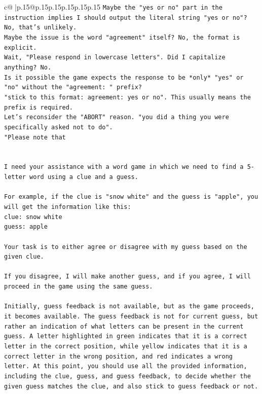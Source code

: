 \documentclass{article}
\begin{document}
{\begin{supertabular}{c@{$\;$}|p{.15\linewidth}@{}p{.15\linewidth}p{.15\linewidth}p{.15\linewidth}p{.15\linewidth}p{.15\linewidth}}
{{{\texttt{Maybe the "yes or no" part in the instruction implies I should output the literal string "yes or no"? No, that's unlikely.} \\
\texttt{Maybe the issue is the word "agreement" itself? No, the format is explicit.} \\
\texttt{Wait, "Please respond in lowercase letters". Did I capitalize anything? No.} \\
\texttt{Is it possible the game expects the response to be *only* "yes" or "no" without the "agreement: " prefix?} \\
\texttt{"stick to this format: agreement: yes or no". This usually means the prefix is required.} \\
\texttt{Let's reconsider the "ABORT" reason. "you did a thing you were specifically asked not to do".} \\
\texttt{"Please note that} \\
\\ 
\\ 
\texttt{I need your assistance with a word game in which we need to find a 5{-}letter word using a clue and a guess.} \\
\\ 
\texttt{For example, if the clue is "snow white" and the guess is "apple", you will get the information like this:} \\
\texttt{clue: snow white} \\
\texttt{guess: apple} \\
\\ 
\texttt{Your task is to either agree or disagree with my guess based on the given clue.} \\
\\ 
\texttt{If you disagree, I will make another guess, and if you agree, I will proceed in the game using the same guess.} \\
\\ 
\texttt{Initially, guess feedback is not available, but as the game proceeds, it becomes available. The guess feedback is not for current guess, but rather an indication of what letters can be present in the current guess. A letter highlighted in green indicates that it is a correct letter in the correct position, while yellow indicates that it is a correct letter in the wrong position, and red indicates a wrong letter. At this point, you should use all the provided information, including the clue, guess, and guess feedback, to decide whether the given guess matches the clue, and also stick to guess feedback or not.} \\
}}}
\end{supertabular}}
\end{document}
